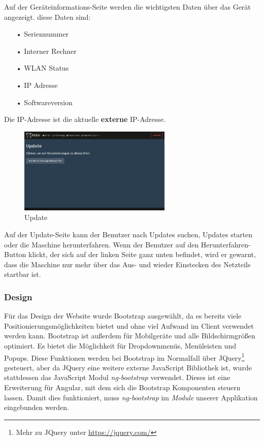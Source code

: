 Auf der Geräteinformations-Seite werden die wichtigsten Daten über das Gerät angezeigt. diese Daten sind:
\begin{itemize}
\item[•]Seriennummer
\item[•]Interner Rechner
\item[•]WLAN Status
\item[•]IP Adresse
\item[•]Softwareversion
\end{itemize}
Die IP-Adresse ist die aktuelle \textbf{externe} IP-Adresse. \newpage

\begin{figure}
\vspace{-10pt}
  \begin{center}
    \includegraphics[width=0.65\textwidth]{Bilder/Greistorfer/Update}
  \end{center}
  \caption{Update}
  \label{Update}
  \vspace{-10pt}
\end{figure}

Auf der Update-Seite kann der Benutzer nach Updates suchen, Updates starten oder die Maschine herunterfahren. Wenn der Benutzer auf den Herunterfahren-Button klickt, der sich auf der linken Seite ganz unten befindet, wird er gewarnt, dass die Maschine nur mehr über das Aus- und wieder Einstecken des Netzteils startbar ist.\\

\subsubsection{Design}
\label{sec:ums-client-design}
Für das Design der Website wurde Bootstrap ausgewählt, da es bereits viele Positionierungsmöglichkeiten bietet und ohne viel Aufwand im Client verwendet werden kann. Bootstrap ist außerdem für Mobilgeräte und alle Bildschirmgrößen optimiert. Es bietet die Möglichkeit für Dropdownmenüs, Menüleisten und Popups. Diese Funktionen werden bei Bootstrap im Normalfall über JQuery\footnote{Mehr zu JQuery unter \url{https://jquery.com/}} gesteuert, aber da JQuery eine weitere externe JavaScript Bibliothek ist, wurde stattdessen das JavaScript Modul \textit{ng-bootstrap} verwendet. Dieses ist eine Erweiterung für Angular, mit dem sich die Bootstrap Komponenten steuern lassen. Damit dies funktioniert, muss \textit{ng-bootstrap} im \textit{Module} unserer Applikation eingebunden werden.


